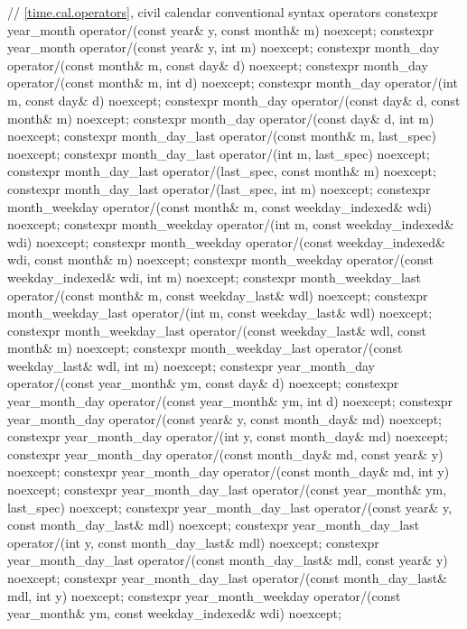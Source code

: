 \begin{codeblock}
{  // \ref{time.cal.operators}, civil calendar conventional syntax operators
  constexpr year_month
    operator/(const year& y, const month& m) noexcept;
  constexpr year_month
    operator/(const year& y, int m) noexcept;
  constexpr month_day
    operator/(const month& m, const day& d) noexcept;
  constexpr month_day
    operator/(const month& m, int d) noexcept;
  constexpr month_day
    operator/(int m, const day& d) noexcept;
  constexpr month_day
    operator/(const day& d, const month& m) noexcept;
  constexpr month_day
    operator/(const day& d, int m) noexcept;
  constexpr month_day_last
    operator/(const month& m, last_spec) noexcept;
  constexpr month_day_last
    operator/(int m, last_spec) noexcept;
  constexpr month_day_last
    operator/(last_spec, const month& m) noexcept;
  constexpr month_day_last
    operator/(last_spec, int m) noexcept;
  constexpr month_weekday
    operator/(const month& m, const weekday_indexed& wdi) noexcept;
  constexpr month_weekday
    operator/(int m, const weekday_indexed& wdi) noexcept;
  constexpr month_weekday
    operator/(const weekday_indexed& wdi, const month& m) noexcept;
  constexpr month_weekday
    operator/(const weekday_indexed& wdi, int m) noexcept;
  constexpr month_weekday_last
    operator/(const month& m, const weekday_last& wdl) noexcept;
  constexpr month_weekday_last
    operator/(int m, const weekday_last& wdl) noexcept;
  constexpr month_weekday_last
    operator/(const weekday_last& wdl, const month& m) noexcept;
  constexpr month_weekday_last
    operator/(const weekday_last& wdl, int m) noexcept;
  constexpr year_month_day
    operator/(const year_month& ym, const day& d) noexcept;
  constexpr year_month_day
    operator/(const year_month& ym, int d) noexcept;
  constexpr year_month_day
    operator/(const year& y, const month_day& md) noexcept;
  constexpr year_month_day
    operator/(int y, const month_day& md) noexcept;
  constexpr year_month_day
    operator/(const month_day& md, const year& y) noexcept;
  constexpr year_month_day
    operator/(const month_day& md, int y) noexcept;
  constexpr year_month_day_last
    operator/(const year_month& ym, last_spec) noexcept;
  constexpr year_month_day_last
    operator/(const year& y, const month_day_last& mdl) noexcept;
  constexpr year_month_day_last
    operator/(int y, const month_day_last& mdl) noexcept;
  constexpr year_month_day_last
    operator/(const month_day_last& mdl, const year& y) noexcept;
  constexpr year_month_day_last
    operator/(const month_day_last& mdl, int y) noexcept;
  constexpr year_month_weekday
    operator/(const year_month& ym, const weekday_indexed& wdi) noexcept;
}
\end{codeblock}
